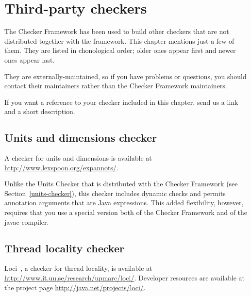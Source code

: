 \htmlhr
\chapter{Third-party checkers\label{third-party-checkers}\label{external-checkers}}

The Checker Framework has been used to build other checkers that are not
distributed together with the framework.  This chapter mentions just a few
of them.  They are listed in chonological order; older ones appear first
and newer ones appear last.

They are externally-maintained, so if you have problems or questions, you
should contact their maintainers rather than the Checker Framework
maintainers.

If you want a reference to your checker included in this chapter,
send us a link and a short description.







\section{Units and dimensions checker\label{units-and-dimensions-checker}}

A checker for units and dimensions is available at
\url{http://www.lexspoon.org/expannots/}.

Unlike the Units Checker that is distributed with the Checker Framework
(see Section~\ref{units-checker}), this checker includes dynamic checks and
permits annotation arguments that are Java expressions.  This added
flexibility, however, requires that you use a special version both of the
Checker Framework and of the javac compiler.


\section{Thread locality checker\label{loci-thread-locality-checker}}

Loci~\cite{WrigstadPMZV2009}, a checker for thread locality, is available at
\url{http://www.it.uu.se/research/upmarc/loci/}.
Developer resources are available at the project page
\url{http://java.net/projects/loci/}.



